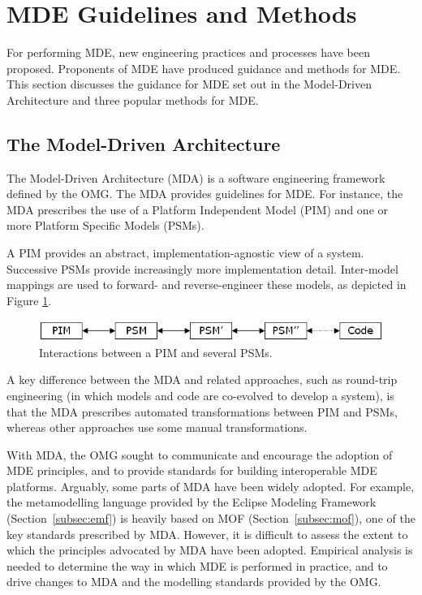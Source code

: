 
\section{MDE Guidelines and Methods}
\label{sec:mde_methods}
For performing MDE, new engineering practices and processes have been proposed. Proponents of MDE have produced guidance and methods for MDE. This section discusses the guidance for MDE set out in the Model-Driven Architecture \cite{mda} and three popular methods for MDE.

\subsection{The Model-Driven Architecture}
The Model-Driven Architecture (MDA) is a software engineering framework defined by the OMG. The MDA provides guidelines for MDE. For instance, the MDA prescribes the use of a Platform Independent Model (PIM) and one or more Platform Specific Models (PSMs).

A PIM provides an abstract, implementation-agnostic view of a system. Successive PSMs provide increasingly more implementation detail. Inter-model mappings are used to forward- and reverse-engineer these models, as depicted in
Figure \ref{fig:mda}.

\begin{figure}[htbp]
  \begin{center}
    \leavevmode
    \includegraphics[scale=0.5]{2.Background/images/PIMs_and_PSMs.png}
  \end{center}
  \caption{Interactions between a PIM and several PSMs.}
  \label{fig:mda}
\end{figure}

A key difference between the MDA and related approaches, such as round-trip engineering (in which models and code are co-evolved to develop a system), is that the MDA prescribes automated transformations between PIM and PSMs, whereas other approaches use some manual transformations.

With MDA, the OMG sought to communicate and encourage the adoption of MDE principles, and to provide standards for building interoperable MDE platforms. Arguably, some parts of MDA have been widely adopted. For example, the metamodelling language provided by the Eclipse Modeling Framework (Section~\ref{subsec:emf}) is heavily based on MOF (Section~\ref{subsec:mof}), one of the key standards prescribed by MDA. However, it is difficult to assess the extent to which the principles advocated by MDA have been adopted. Empirical analysis is needed to determine the way in which MDE is performed in practice, and to drive changes to MDA and the modelling standards provided by the OMG.

